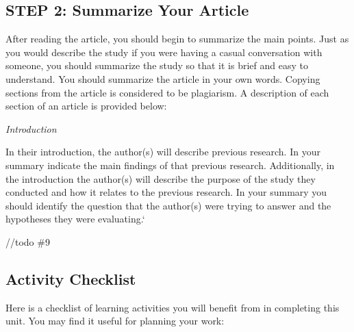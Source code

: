 \documentclass[
]{book}
\begin{document}
\hypertarget{step-2-summarize-your-article}{%
\subsection*{STEP 2: Summarize Your Article}\label{step-2-summarize-your-article}}

After reading the article, you should begin to summarize the main points. Just as you would describe the study if you were having a casual conversation with someone, you should summarize the study so that it is brief and easy to understand. You should summarize the article in your own words. Copying sections from the article is considered to be plagiarism. A description of each section of an article is provided below:

\emph{Introduction}

In their introduction, the author(s) will describe previous research. In your summary indicate the main findings of that previous research. Additionally, in the introduction the author(s) will describe the purpose of the study they conducted and how it relates to the previous research. In your summary you should identify the question that the author(s) were trying to answer and the hypotheses they were evaluating.`

//todo \#9

\hypertarget{activity-checklist-12}{%
\subsection*{Activity Checklist}\label{activity-checklist-12}}

Here is a checklist of learning activities you will benefit from in completing this unit. You may find it useful for planning your work:
\end{document}
